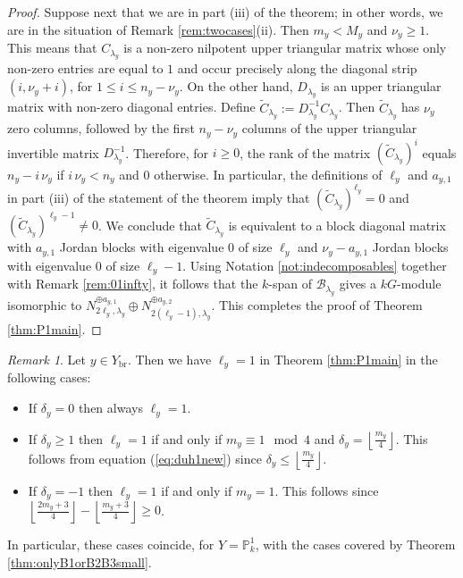 \documentclass{amsart}
\numberwithin{equation}{section}
\numberwithin{table}{section}
\theoremstyle{plain}
\theoremstyle{definition}
\theoremstyle{remark}
\newtheorem{remark}[theorem]{Remark}
\begin{document}
\begin{proof}
Suppose next that we are in part (iii) of the theorem; in other words, we are in the situation of Remark \ref{rem:twocases}(ii). Then $m_y < M_y$ and $\nu_y\ge 1$. This means that $C_{\lambda_y}$ is a non-zero nilpotent upper triangular matrix whose only non-zero entries are equal to $1$ and occur precisely along the diagonal strip $(i,\nu_y+i)$, for $1\le i \le n_y-\nu_y$. On the other hand, $D_{\lambda_y}$ is an upper triangular matrix with non-zero diagonal entries. Define $\widetilde{C}_{\lambda_y} := D_{\lambda_y}^{-1}C_{\lambda_y}$. Then $\widetilde{C}_{\lambda_y}$ has $\nu_y$ zero columns, followed by the first $n_y-\nu_y$ columns of the upper triangular invertible matrix $D_{\lambda_y}^{-1}$. Therefore, for $i\ge 0$, the rank of the matrix $(\widetilde{C}_{\lambda_y})^i$ equals $n_y-i\,\nu_y$ if $i\,\nu_y < n_y$ and $0$ otherwise. In particular, the definitions of $\ell_y$ and $a_{y,1}$ in part (iii) of the statement of the theorem imply that $(\widetilde{C}_{\lambda_y})^{\ell_y}=0$ and $(\widetilde{C}_{\lambda_y})^{\ell_y-1}\ne 0$. We conclude that $\widetilde{C}_{\lambda_y}$ is equivalent to a block diagonal matrix with  $a_{y,1}$ Jordan blocks with eigenvalue $0$ of size $\ell_y$ and $\nu_y-a_{y,1}$ Jordan blocks with eigenvalue $0$ of size $\ell_y-1$. Using Notation \ref{not:indecomposables} together with Remark \ref{rem:01infty}, it follows that the $k$-span of $\mathcal{B}_{\lambda_y}$ gives a $kG$-module isomorphic to $N_{2\ell_y,\lambda_y}^{\oplus a_{y,1}} \oplus N_{2(\ell_y-1),\lambda_y}^{\oplus a_{y,2}}$. This completes the proof of Theorem \ref{thm:P1main}.
\end{proof}

\begin{remark}
\label{rem:smallEll}
Let $y\in Y_{\mathrm{br}}$. Then we have $\ell_y=1$ in Theorem \ref{thm:P1main} in the following cases:
\begin{itemize}
\item[(i)] If $\delta_y=0$ then always $\ell_y=1$.
\item[(ii)] If $\delta_y\ge 1$ then $\ell_y=1$ if and only if $m_y\equiv 1\mod 4$ and $\delta_y=\left\lfloor\frac{m_y}{4}\right\rfloor$. This follows from equation (\ref{eq:duh1new}) since $\delta_y \le \left\lfloor\frac{m_y}{4}\right\rfloor$.
\item[(iii)] If $\delta_y=-1$ then $\ell_y=1$ if and only if $m_y=1$. This follows since $\left\lfloor \frac{2m_y+3}{4}\right\rfloor - \left\lfloor \frac{m_y+3}{4}\right\rfloor\ge 0$.
\end{itemize}
In particular, these cases coincide, for $Y=\mathbb{P}^1_k$, with the cases covered by Theorem \ref{thm:onlyB1orB2B3small}.
\end{remark}
\end{document}
